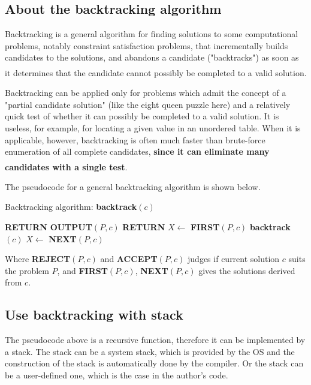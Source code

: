 \documentclass[cn,black,12pt,normal]{elegantnote}
\newcommand{\uct}[1]{\textsuperscript{\textsuperscript{\cite{#1}}}}
\begin{document}
\subsection{About the backtracking algorithm}

Backtracking is a general algorithm for finding solutions to some computational problems, notably constraint satisfaction problems, that incrementally builds candidates to the solutions, and abandons a candidate ("backtracks") as soon as it determines that the candidate cannot possibly be completed to a valid solution.\uct{gurari1999cis}

Backtracking can be applied only for problems which admit the concept of a "partial candidate solution" (like the eight queen puzzle here) and a relatively quick test of whether it can possibly be completed to a valid solution. It is useless, for example, for locating a given value in an unordered table. When it is applicable, however, backtracking is often much faster than brute-force enumeration of all complete candidates, \textbf{since it can eliminate many candidates with a single test}.\uct{wiki:Backtracking}

The pseudocode for a general backtracking algorithm is shown below.

\begin{algorithm}[H]
    \caption{Backtracking algorithm: \textbf{backtrack}$(c)$}
    \label{alg1}
    \begin{algorithmic}
        \STATE \textbf{RETURN}
        \ENDIF
        \STATE \textbf{OUTPUT}$(P,c)$
        \STATE \textbf{RETURN}
        \ENDIF
        \STATE $X \gets$ \textbf{FIRST}$(P,c)$
        \STATE \textbf{backtrack}$(c)$
        \STATE $X \gets$ \textbf{NEXT}$(P,c)$
        \ENDWHILE
    \end{algorithmic}
\end{algorithm}

Where \textbf{REJECT}$(P,c)$ and \textbf{ACCEPT}$(P,c)$ judges if current solution $c$ suits the problem $P$, and \textbf{FIRST}$(P,c)$, \textbf{NEXT}$(P,c)$ gives the solutions derived from $c$.

\subsection{Use backtracking with stack}
The pseudocode above is a recursive function, therefore it can be implemented by a stack. The stack can be a system stack, which is provided by the OS and the construction of the stack is automatically done by the compiler. Or the stack can be a user-defined one, which is the case in the author's code.
\end{document}
